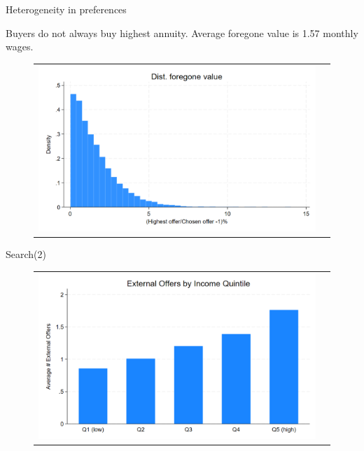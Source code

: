 \documentclass[10pt,aspectratio=169]{beamer}
\begin{document}

\begin{frame}{Heterogeneity in preferences}\label{slide:fig3}    

Buyers do not always buy highest annuity. Average foregone value is 1.57 monthly wages.

\begin{figure}[H]
\centering{}%
\begin{tabular}{cc}
\includegraphics[scale=0.25]{../figures/IE3_foregone_hist.png}
\end{tabular}
\end{figure}
\hyperlink{slide:answer1}{}

\end{frame}


\begin{frame}{Search(2)}\label{slide:fig4}    

\begin{figure}[H]
\centering{}%
\begin{tabular}{cc}
\includegraphics[scale=0.27]{../figures/IE3_search_by_income_quintile.png}
\end{tabular}
\end{figure}
\hyperlink{slide:single_fig}{}
\end{frame}
\end{document}
